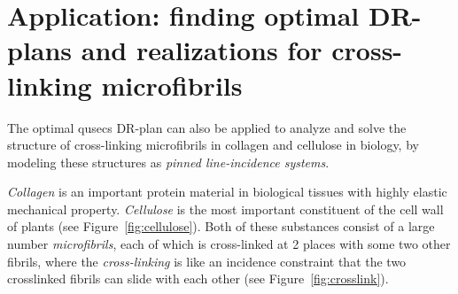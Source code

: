 \section{Application: finding optimal DR-plans and realizations for cross-linking microfibrils }
\label{sec:pinnedline}

The optimal qusecs DR-plan can also be applied to analyze and solve
the structure of  cross-linking microfibrils in collagen and cellulose in biology,
by modeling these structures as {\em pinned line-incidence systems}.

{\em Collagen} is an important protein material in biological tissues with highly elastic mechanical property.
{\em Cellulose} is the most important constituent of the cell wall of plants (see Figure~\ref{fig:cellulose}).
Both of these substances consist of a large number {\em microfibrils},
each of which is cross-linked at 2 places with some two other fibrils,
where the {\em  cross-linking} is like an incidence constraint that
the two crosslinked fibrils can slide with each other  \cite{xxx} (see Figure~\ref{fig:crosslink}).

%
%
%
%
%
%


